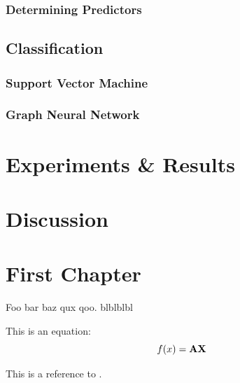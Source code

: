 \documentclass[
	fontsize=10pt, %
	twoside=false, %
	secnumdepth=1, %
]{kaobook}
\begin{document}

\subsection{Determining Predictors}

\section{Classification}

\subsection{Support Vector Machine}

\subsection{Graph Neural Network}


\chapter{Experiments \& Results}
\blindtext


\chapter{Discussion}
\blindtext



\pagebreak

\chapter{First Chapter}

Foo bar baz qux qoo. blblblbl

This is an equation:
\begin{equation}
  \label{eq:foo}
  f(x) = \mathbf{A} \mathbf{X}
\end{equation}

This is a reference to .
\end{document}
